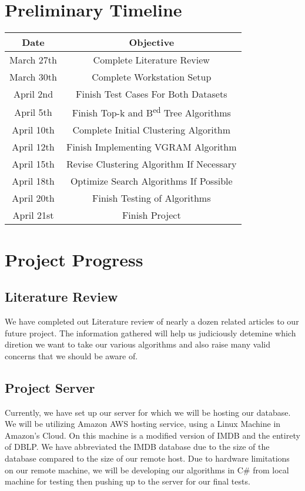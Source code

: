 \documentclass[pdftex,12pt,letter]{article}
\begin{document}
\section{Preliminary Timeline}
\begin{tabular} {| c | c |}
\hline
\bf{Date} & \bf{Objective}\\ \hline
March 27th & Complete Literature Review\\ \hline
March 30th & Complete Workstation Setup\\ \hline
April 2nd & Finish Test Cases For Both Datasets\\ \hline
April 5th & Finish Top-k and B\textsuperscript{ed} Tree Algorithms\\ \hline
April 10th & Complete Initial Clustering Algorithm \\ \hline
April 12th & Finish Implementing VGRAM Algorithm\\ \hline
April 15th & Revise Clustering Algorithm If Necessary\\ \hline
April 18th & Optimize Search Algorithms If Possible\\ \hline
April 20th & Finish Testing of Algorithms\\ \hline
April 21st & Finish Project\\ \hline
\end{tabular}

\section{Project Progress}
\subsection{Literature Review}
We have completed out Literature review of nearly a dozen related articles to our future project. The information gathered will help us judiciously detemine which diretion we want to take our various algorithms and also raise many valid concerns that we should be aware of. 
\subsection{Project Server}
Currently, we have set up our server for which we will be hosting our database. We will be utilizing Amazon AWS hosting service, using a Linux Machine in Amazon's Cloud. On this machine is a modified version of IMDB and the entirety of DBLP. We have abbreviated the IMDB database due to the size of the database compared to the size of our remote host. Due to hardware limitations on our remote machine, we will be developing our algorithms in C\# from local machine for testing then pushing up to the server for our final tests.
\end{document}
